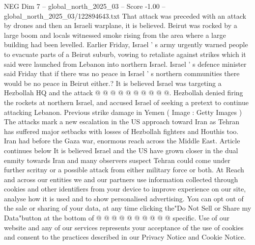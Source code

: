 \begin{textsample}{NEG Dim 7 – global\_north\_2025\_03 – Score -1.00 – global\_north\_2025\_03/122894643.txt}
That attack was preceded with an attack by drones and then an Israeli warplane, it is believed.
Beirut was rocked by a large boom and locals witnessed smoke rising from the area where a large building had been levelled.
Earlier Friday, Israel ' s army urgently warned people to evacuate parts of a Beirut suburb, vowing to retaliate against strikes which it said were launched from Lebanon into northern Israel.
Israel ' s defence minister said Friday that if there was no peace in Israel ' s northern communities there would be no peace in Beirut either.?
It is believed Israel was targeting a Hezbollah HQ and the attack @ @ @ @ @ @ @ @ @ @.
Hezbollah denied firing the rockets at northern Israel, and accused Israel of seeking a pretext to continue attacking Lebanon.
Previous strike damage in Yemen ( Image : Getty Images ) The attacks mark a new escalation in the US approach toward Iran as Tehran has suffered major setbacks with losses of Hezbollah fighters and Houthis too.
Iran had before the Gaza war, enormous reach across the Middle East.
Article continues below It is believed Israel and the US have grown closer in the dual enmity towards Iran and many observers suspect Tehran could come under further scritny or a possible attack from either military force or both.
At Reach and across our entities we and our partners use information collected through cookies and other identifiers from your device to improve experience on our site, analyse how it is used and to show personalised advertising.
You can opt out of the sale or sharing of your data, at any time clicking the"Do Not Sell or Share my Data"button at the bottom of @ @ @ @ @ @ @ @ @ @ specific.
Use of our website and any of our services represents your acceptance of the use of cookies and consent to the practices described in our Privacy Notice and Cookie Notice.

\end{textsample}
